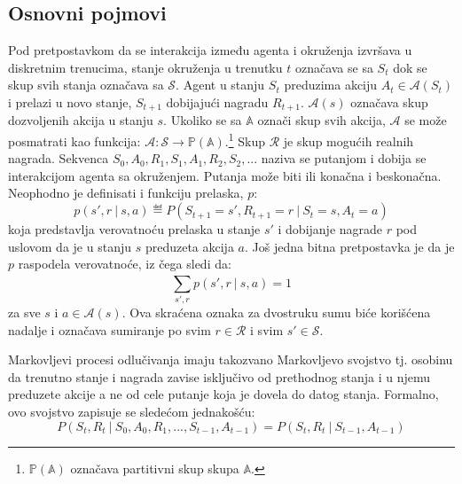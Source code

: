 \subsection{Osnovni pojmovi}
Pod pretpostavkom da se interakcija između agenta i okruženja izvršava u diskretnim trenucima, stanje okruženja u trenutku $t$ označava se sa $S_t$ dok se skup svih stanja označava sa $\mathcal{S}$.  Agent u stanju $S_t$ preduzima akciju $A_t \in \mathcal{A}(S_t)$ i prelazi u novo stanje, $S_{t+1}$ dobijajući nagradu $R_{t+1}$. $\mathcal{A}(s)$ označava skup dozvoljenih akcija u stanju $s$. Ukoliko se sa $\mathbb{A}$ označi skup svih akcija, $\mathcal{A}$ se može posmatrati kao funkcija:  $\mathcal{A}: \mathcal{S} \rightarrow  \mathbb{P}(\mathbb{A})$.\footnote{$\mathbb{P}(\mathbb{A})$ označava partitivni skup skupa $\mathbb{A}$.} Skup $\mathcal{R}$ je skup mogućih realnih nagrada. Sekvenca $S_0, A_0, R_1, S_1, A_1, R_2, S_2, ...$ naziva se putanjom i dobija se interakcijom agenta sa okruženjem. Putanja može biti ili konačna i beskonačna.
Neophodno je definisati i funkciju prelaska, $p$:
\begin{equation}
	p(s', r~|~s, a) \eqdef P(S_{t+1} = s', R_{t+1} = r ~|~ S_t = s, A_t = a)
\end{equation}
koja predstavlja verovatnoću prelaska u stanje $s'$ i dobijanje nagrade $r$ pod uslovom da je u stanju $s$ preduzeta akcija $a$. Još jedna bitna pretpostavka je da je $p$ raspodela verovatnoće, iz čega sledi da:
\begin{equation}
	\sum_{s', r}^{} p(s', r~|~s, a) = 1
\end{equation}
za sve $s$ i $a \in \mathcal{A}(s)$. Ova skraćena oznaka za dvostruku sumu biće korišćena nadalje i označava sumiranje po svim $r \in \mathcal{R}$ i svim $s' \in \mathcal{S}$.
\par 
Markovljevi procesi odlučivanja imaju takozvano Markovljevo svojstvo tj. osobinu da trenutno stanje i nagrada zavise isključivo od prethodnog stanja i u njemu preduzete akcije a ne od cele putanje koja je dovela do datog stanja. Formalno, ovo svojstvo zapisuje se sledećom jednakošću:
\begin{equation}
	P(S_t, R_t ~|~ S_0, A_0, R_1, ..., S_{t-1}, A_{t-1}) = P(S_t, R_t ~|~ S_{t-1}, A_{t-1})
\end{equation}

